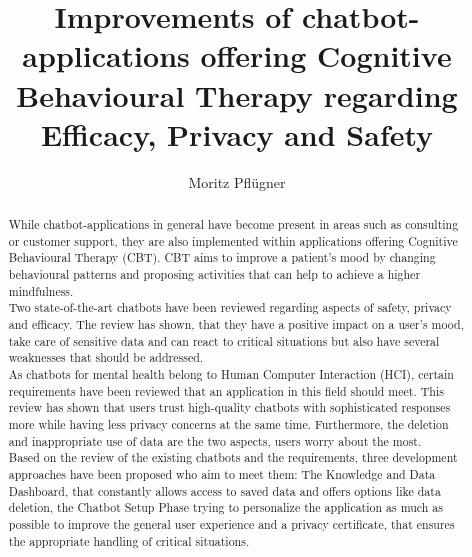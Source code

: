 \documentclass[sigconf, nonacm]{acmart}
\begin{document}
\graphicspath{ {./images/} }

\title{Improvements of chatbot-applications offering Cognitive Behavioural Therapy regarding Efficacy, Privacy and Safety}

\author{Moritz Pflügner}


\begin{abstract}
While chatbot-applications in general have become present in areas such as consulting or customer support, they are also implemented
within applications offering Cognitive Behavioural Therapy (CBT). CBT aims to improve a patient's mood by changing behavioural patterns and proposing
activities that can help to achieve a higher mindfulness.
\\
Two state-of-the-art chatbots have been reviewed regarding aspects of safety, privacy and efficacy. The review has shown, that they have a positive 
impact on a user's mood, take care of sensitive data and can react to critical situations but also have several weaknesses that should be addressed.
\\
As chatbots for mental health belong to Human Computer Interaction (HCI), certain requirements have been reviewed that an application in this field should meet. This review has shown
that users trust high-quality chatbots with sophisticated responses more while having less privacy concerns at the same time. Furthermore, the deletion and 
inappropriate use of data are the two aspects, users worry about the most. 
\\
Based on the review of the existing chatbots and the requirements, three development approaches have been proposed who aim to meet them:
The Knowledge and Data Dashboard, that constantly allows access to saved data and offers options like data deletion, 
the Chatbot Setup Phase trying to personalize the application as much as possible to improve the general user experience and 
a privacy certificate, that ensures the appropriate handling of critical situations.   
\end{abstract}
\end{document}
